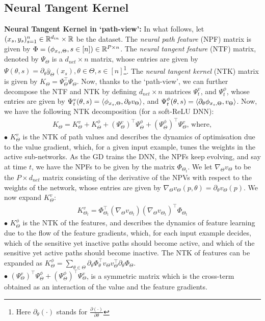 \subsection{Neural Tangent Kernel}\label{sec:kernels}
\textbf{Neural Tangent Kernel in `path-view':} In what follows, let $(x_s,y_s)_{s=1}^n\in\mathbb{R}^{d_{in}}\times\mathbb{R}$ be the dataset. The \emph{neural path feature} (NPF) matrix is given by $\Phi=(\phi_{x_s,\Theta},s\in[n])\in\mathbb{R}^{P\times n}$. The \emph{neural tangent feature} (NTF) matrix, denoted by $\Psi_{\Theta}$ is a $d_{net}\times n$ matrix, whose entries are given by $\Psi(\theta,s)=\partial_{\theta} \hat{y}_{\Theta}(x_s),\theta\in\Theta, s\in[n]$\footnote{Here $\partial_{\theta}(\cdot)$ stands for $\frac{\partial (\cdot)}{\partial \theta}$}. The \emph{neural tangent kernel} (NTK) matrix is given by $K_{\Theta}=\Psi_{\Theta}^\top\Psi_{\Theta}$. Now, thanks to the `path-view', we can further decompose the NTF and NTK by defining $d_{net}\times n$ matrices $\Psi^v_t$, and $\Psi^{\phi}_t$, whose entries are given by $\Psi^v_t(\theta,s)=\langle \phi_{x_s,\Theta},\partial_{\theta}v_{\Theta}\rangle$, and  $\Psi^{\phi}_t(\theta,s)=\langle \partial_{\theta}\phi_{x_s,\Theta}, v_{\Theta}\rangle$. Now, we have the following NTK decomposition (for a soft-ReLU DNN):
\begin{align}
K_{\Theta}=K^v_{\Theta}+K^{\phi}_{\Theta}+(\Psi^v_\Theta)^\top \Psi^{\phi}_{\Theta} +(\Psi^{\phi}_\Theta)^\top \Psi^{v}_{\Theta},\,\text{where},
\end{align}
$\bullet$ $K^v_{\Theta}$ is the NTK of path values and describes the dynamics of optimisation due to the value gradient, which, for a given input example, tunes the weights in the active sub-networks. As the GD trains the DNN, the NPFs keep evolving, and say at time $t$, we have the NPFs to be given by the matrix $\Phi_{\Theta_t}$. We let $\nabla_{\Theta}v_{\Theta}$ to be the $P\times d_{net}$ matrix consisting of the derivative of the NPVs with respect to the weights of the network, whose entries are given by $\nabla_{\Theta}v_{\Theta}(p,\theta)=\partial_{\theta}v_{\Theta}(p)$. We now expand $K^v_{\Theta}$:
\begin{align}
K^{v}_{\Theta_t}=\Phi^\top_{\Theta_t}(\nabla_{\Theta} v_{\Theta_t})(\nabla_{\Theta} v_{\Theta_t})^\top \Phi_{\Theta_t}
\end{align}
$\bullet$ $K^{\phi}_{\Theta}$ is the NTK of the features, and describes the dynamics of feature learning due to the flow of the feature gradients, which, for each input example decides, which of the sensitive yet inactive paths should become active, and which of the sensitive yet active paths should become inactive. The NTK of features can be expanded as $K^{\phi}_{\Theta}=\sum_{\theta \in \Theta}\partial_{\theta} \Phi^\top_{\theta}v_{\Theta}v^\top_{\Theta}\partial_{\theta}\Phi_{\Theta}$.\\ 
$\bullet$ $(\Psi^v_\Theta)^\top \Psi^{\phi}_{\Theta} +(\Psi^{\phi}_\Theta)^\top \Psi^{v}_{\Theta}$, is a symmetric matrix which is the cross-term obtained as an interaction of the value and the feature gradients.

